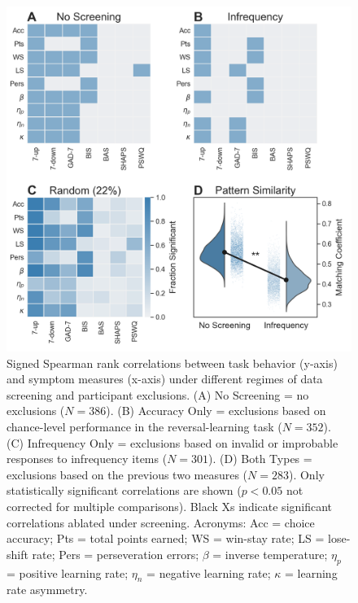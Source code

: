 \documentclass[a4paper,notitlepage,12pt]{article}
\begin{document}
\begin{figure}[H]
    \includegraphics[width=17cm]{../figures/supp_01.png}
    \centering
    \caption{Signed Spearman rank correlations between task behavior (y-axis) and symptom measures (x-axis) under different regimes of data screening and participant exclusions. (A) No Screening = no exclusions ($N=386$). (B) Accuracy Only = exclusions based on chance-level performance in the reversal-learning task ($N=352$). (C) Infrequency Only = exclusions based on invalid or improbable responses to infrequency items ($N=301$). (D) Both Types = exclusions based on the previous two measures ($N=283$). Only statistically significant correlations are shown ($p<0.05$ not corrected for multiple comparisons). Black Xs indicate significant correlations ablated under screening. Acronyms: Acc = choice accuracy; Pts = total points earned; WS = win-stay rate; LS = lose-shift rate; Pers = perseveration errors; $\beta$ = inverse temperature; $\eta_p$ = positive learning rate; $\eta_n$ = negative learning rate; $\kappa$ = learning rate asymmetry.}
    \label{fig:figS01}
\end{figure}

\clearpage
\end{document}
